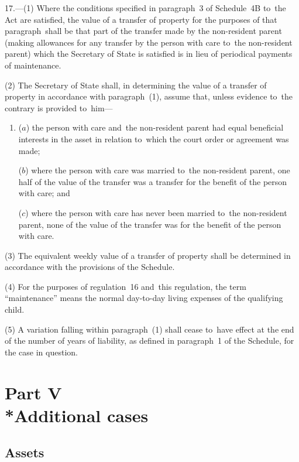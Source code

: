 \documentclass[12pt,a4paper]{article}
\begin{document}
17.---(1)  Where the conditions specified in paragraph~3 of Schedule~4B to~the Act are satisfied, the value of a transfer of property for the purposes of that paragraph~shall be that part of the transfer made by the non-resident parent (making allowances for any transfer by the person with care to~the non-resident parent) which the Secretary of State is satisfied is in lieu of periodical payments of maintenance.

(2) The Secretary of State shall, in determining the value of a transfer of property in accordance with paragraph~(1), assume that, unless evidence to~the contrary is provided to~him—
\begin{enumerate}\item[]
($a$) the person with care and~the non-resident parent had equal beneficial interests in the asset in relation to~which the court order or agreement was made;

($b$) where the person with care was married to~the non-resident parent, one half of the value of the transfer was a transfer for the benefit of the person with care; and

($c$) where the person with care has never been married to~the non-resident parent, none of the value of the transfer was for the benefit of the person with care.
\end{enumerate}

(3) The equivalent weekly value of a transfer of property shall be determined in accordance with the provisions of the Schedule.

(4) For the purposes of regulation~16 and~this regulation, the term “maintenance” means the normal day-to-day living expenses of the qualifying child.

(5) A variation falling within paragraph~(1) shall cease to~have effect at the end of the number of years of liability, as defined in paragraph~1 of the Schedule, for the case in question.

\section[Part V --- Additional cases]{Part V\\*Additional cases}

\subsection[18. Assets]{Assets}

\renewcommand\parthead{--- Part V}
\end{document}
